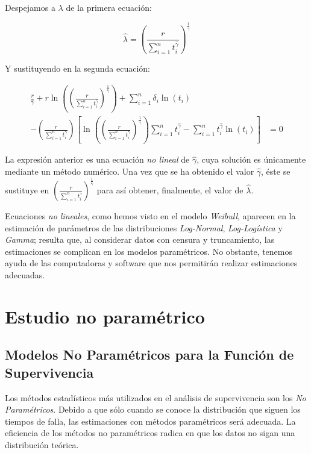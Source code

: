 \documentclass[
  a4paper,
  oneside,
  openany]{book}
\begin{document}
Despejamos a \(\lambda\) de la primera ecuación:

\[
\hat\lambda=\left(\frac{r}{\sum_{i=1}^{n}t_i^{\hat\gamma}}\right)^{\frac{1}{\hat\gamma}}
\]

Y sustituyendo en la segunda ecuación:

\[
\begin{array}{cc}
\frac{r}{\hat\gamma}+r\ln\left(\left(\frac{r}{\sum_{i=1}^{n}t_i^{\hat\gamma}}\right)^{\frac{1}{\hat \gamma}}\right)+\sum_{i=1}^{n}\delta_i\ln(t_i)&\\
-\left(\frac{r}{\sum_{i=1}^{n}t_i^{\hat \gamma}}\right)\left[\ln\left(\left(\frac{r}{\sum_{i=1}^{n}t_i^{\hat \gamma}}\right)^{\frac{1}{\hat \gamma}}\right)\sum_{i=1}^{n}t_i^{\hat \gamma}-\sum_{i=1}^{n}t_i^{\hat \gamma}\ln(t_i)\right]&=0
\end{array}
\]

La expresión anterior es una ecuación \emph{no lineal} de \(\hat \gamma\), cuya solución es únicamente mediante un método numérico. Una vez que se ha obtenido el valor \(\hat \gamma\), éste se sustituye en \(\left(\frac{r}{\sum_{i=1}^{n}t_i^{\hat \gamma}}\right)^{\frac{1}{\hat \gamma}}\) para así obtener, finalmente, el valor de \(\hat \lambda\).

Ecuaciones \emph{no lineales}, como hemos visto en el modelo \emph{Weibull}, aparecen en la estimación de parámetros de las distribuciones \emph{Log-Normal}, \emph{Log-Logística} y \emph{Gamma}; resulta que, al considerar datos con censura y truncamiento, las estimaciones se complican en los modelos paramétricos. No obstante, tenemos ayuda de las computadoras y software que nos permitirán realizar estimaciones adecuadas.

\hypertarget{part-estudio-no-paramuxe9trico}{%
\part{Estudio no paramétrico}\label{part-estudio-no-paramuxe9trico}}

\hypertarget{modelos-no-paramuxe9tricos-para-la-funciuxf3n-de-supervivencia}{%
\chapter{Modelos No Paramétricos para la Función de Supervivencia}\label{modelos-no-paramuxe9tricos-para-la-funciuxf3n-de-supervivencia}}

Los métodos estadísticos más utilizados en el análisis de supervivencia son los \emph{No Paramétricos}. Debido a que sólo cuando se conoce la distribución que siguen los tiempos de falla, las estimaciones con métodos paramétricos será adecuada. La eficiencia de los métodos no paramétricos radica en que los datos no sigan una distribución teórica.
\end{document}
